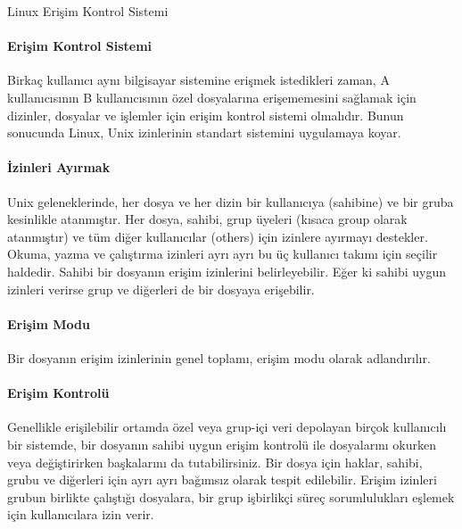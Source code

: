 \begin{section}{Linux Erişim Kontrol Sistemi}
\paragraph{Erişim Kontrol Sistemi}{Birkaç kullanıcı aynı bilgisayar sistemine erişmek istedikleri zaman, A kullanıcısının B kullanıcısının özel dosyalarına erişememesini sağlamak için dizinler, dosyalar ve işlemler için erişim kontrol sistemi olmalıdır. Bunun sonucunda Linux, Unix izinlerinin standart sistemini uygulamaya koyar.}
\paragraph{İzinleri Ayırmak}{Unix geleneklerinde, her dosya ve her dizin bir kullanıcıya (sahibine) ve bir gruba kesinlikle atanmıştır. Her dosya, sahibi, grup üyeleri (kısaca group olarak atanmıştır) ve tüm diğer kullanıcılar (others) için izinlere ayırmayı destekler. Okuma, yazma ve çalıştırma izinleri ayrı ayrı bu üç kullanıcı takımı için seçilir haldedir. Sahibi bir dosyanın erişim izinlerini belirleyebilir. Eğer ki sahibi uygun izinleri verirse grup ve diğerleri de bir dosyaya erişebilir.}
\paragraph{Erişim Modu}{Bir dosyanın erişim izinlerinin genel toplamı, erişim modu olarak adlandırılır.}
\paragraph{Erişim Kontrolü}{Genellikle erişilebilir ortamda özel veya grup-içi veri depolayan birçok kullanıcılı bir sistemde, bir dosyanın sahibi uygun erişim kontrolü ile dosyalarını okurken veya değiştirirken başkalarını da tutabilirsiniz. Bir dosya için haklar, sahibi, grubu ve diğerleri için ayrı ayrı bağımsız olarak tespit edilebilir. Erişim izinleri grubun birlikte çalıştığı dosyalara, bir grup işbirlikçi süreç sorumlulukları eşlemek için kullanıcılara izin verir.}
\end{section}
